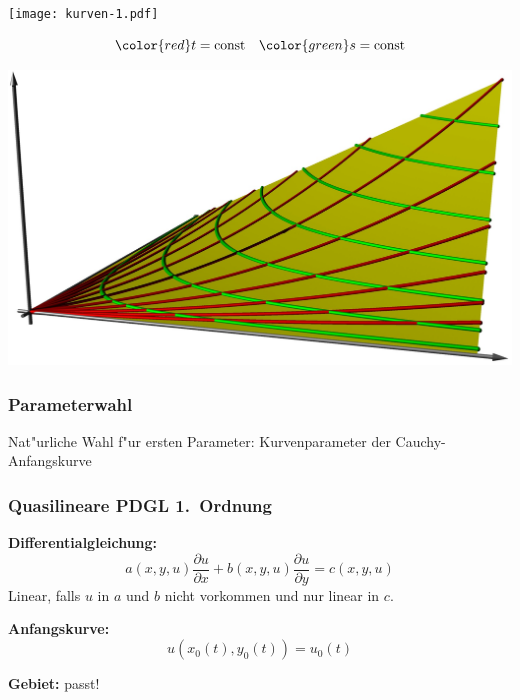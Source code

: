 \documentclass{beamer}
\begin{document}
\begin{frame}
\frametitle{}
\begin{center}
\texttt{[image: kurven-1.pdf]}
\end{center}
\[
\color{red} t=\text{const}
\quad
\color{green} s=\text{const}
\]
\end{frame}

\begin{frame}
\begin{center}
\includegraphics[width=\hsize]{surface.jpg}
\end{center}
\end{frame}


\begin{frame}
\frametitle{Parameterwahl}
Nat"urliche Wahl f"ur ersten Parameter: Kurvenparameter der Cauchy-Anfangskurve
\end{frame}

\begin{frame}
\frametitle{Quasilineare PDGL 1.~Ordnung}
{\bf Differentialgleichung:}
\[
a(x,y,u)\frac{\partial u}{\partial x}+b(x,y,u)\frac{\partial u}{\partial y}
=c(x,y,u)
\]
\pause
Linear, falls $u$ in $a$ und $b$ nicht vorkommen und nur linear in $c$.
\pause

\medskip

{\bf Anfangskurve:}
\pause
\[
u(x_0(t),y_0(t))=u_0(t)
\]
\pause

\smallskip

{\bf Gebiet:} \pause passt!
\end{frame}
\end{document}
